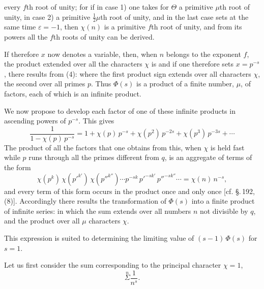 every $f$th root of unity; for if in case 1) one takes for $\Theta$ a
primitive $\mu$th root of unity, in case 2) a primitive $\frac{1}{2}\mu$th
root of unity, and in the last case sets at the same time $\varepsilon = -1$,
then $\chi(n)$ is a primitive $f$th root of unity, and from its powers
all the $f$th roots of unity can be derived.

If therefore $x$ now denotes a variable, then, when $n$ belongs to the
exponent $f$, the product extended over all the characters $\chi$ is
and if one therefore sets $x = p^{-s}$, there results from (4):
where the first product sign extends over all characters $\chi$, the second
over all primes $p$. Thus $\Phi(s)$ is a product of a finite number, $\mu$,
of factors, each of which is an infinite product.

We now propose to develop each factor of one of these infinite products in
ascending powers of $p^{-s}$. This gives
\[
\frac{1}{1-\chi(p)\,p^{-s}} = 1 + \chi(p)\,p^{-s} + \chi(p^2)\,p^{-2s} + \chi(p^3)\,p^{-3s} + \cdots
\]
The product of all the factors that one obtains from this, when $\chi$ is
held fast while $p$ runs through all the primes different from $q$, is an
aggregate of terms of the form
\[
\chi(p^k)\,\chi(p'^{k'})\,\chi(p''^{k''}) \cdots p^{-sk}\,p'^{-sk'}\,p''^{-sk''} \cdots = \chi(n)\,n^{-s},
\]
and every term of this form occurs in the product once and only once
[cf. \S.\,192, (8)]. Accordingly there results the transformation of $\Phi(s)$
into a finite product of infinite series:
in which the sum extends over all numbers $n$ not divisible by $q$,
and the product over all $\mu$ characters $\chi$.

This expression is suited to determining the limiting value of
$(s-1)\,\Phi(s)$ for $s=1$.

Let us first consider the sum corresponding to the principal character
$\chi = 1$,
\[
\overset{n}{\Sigma} \frac{1}{n^s}.
\]
